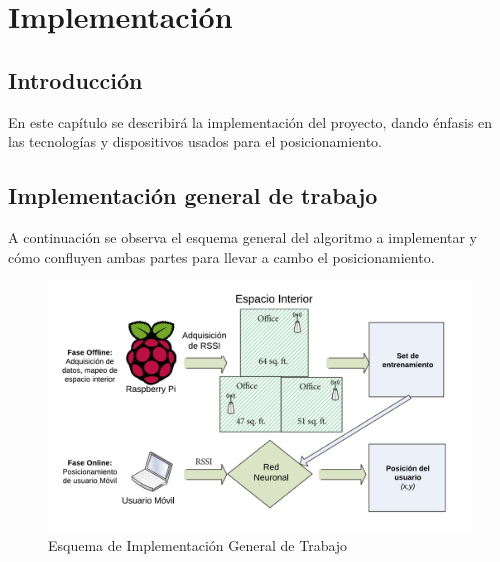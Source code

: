 \chapter{Implementación}
\section{Introducción}

En este capítulo se describirá la implementación del proyecto, dando énfasis en las tecnologías y dispositivos usados para el posicionamiento.

\section{Implementación general de trabajo}
A continuación se observa el esquema general del algoritmo a implementar y cómo confluyen ambas partes para llevar a cambo el posicionamiento.

\begin{figure}[h!]
    \centering
    \includegraphics[scale=0.6]{./images/esquema}
    \caption{Esquema de Implementación General de Trabajo}
    \label{fig:esquema2}
\end{figure}


